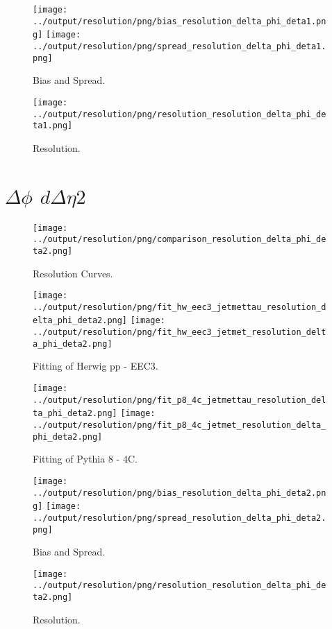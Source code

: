 \documentclass[11pt]{book}
\begin{document}
\begin{figure}[ht]
\centering
\texttt{[image: ../output/resolution/png/bias\_resolution\_delta\_phi\_deta1.png]}
\texttt{[image: ../output/resolution/png/spread\_resolution\_delta\_phi\_deta1.png]}
\caption{Bias and Spread.}
\end{figure}


\begin{figure}[ht]
\centering
\texttt{[image: ../output/resolution/png/resolution\_resolution\_delta\_phi\_deta1.png]}
\caption{Resolution.}
\end{figure}
\clearpage


\section{$\Delta\phi$ $d\Delta\eta 2$}

\begin{figure}[ht]
\centering
\texttt{[image: ../output/resolution/png/comparison\_resolution\_delta\_phi\_deta2.png]}
\caption{Resolution Curves.}
\end{figure}


\begin{figure}[ht]
\centering
\texttt{[image: ../output/resolution/png/fit\_hw\_eec3\_jetmettau\_resolution\_delta\_phi\_deta2.png]}
\texttt{[image: ../output/resolution/png/fit\_hw\_eec3\_jetmet\_resolution\_delta\_phi\_deta2.png]}
\caption{Fitting of Herwig pp - EEC3.}
\end{figure}

\begin{figure}[ht]
\centering
\texttt{[image: ../output/resolution/png/fit\_p8\_4c\_jetmettau\_resolution\_delta\_phi\_deta2.png]}
\texttt{[image: ../output/resolution/png/fit\_p8\_4c\_jetmet\_resolution\_delta\_phi\_deta2.png]}
\caption{Fitting of Pythia 8 - 4C.}
\end{figure}

\begin{figure}[ht]
\centering
\texttt{[image: ../output/resolution/png/bias\_resolution\_delta\_phi\_deta2.png]}
\texttt{[image: ../output/resolution/png/spread\_resolution\_delta\_phi\_deta2.png]}
\caption{Bias and Spread.}
\end{figure}


\begin{figure}[ht]
\centering
\texttt{[image: ../output/resolution/png/resolution\_resolution\_delta\_phi\_deta2.png]}
\caption{Resolution.}
\end{figure}
\clearpage
\end{document}
